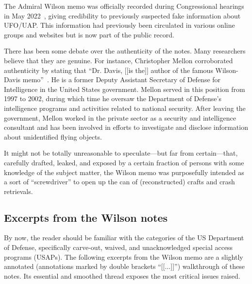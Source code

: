 The Admiral Wilson memo was officially recorded during Congressional hearings in May 2022~\cite{WilsonNotes-Davis}, giving credibility to previously suspected fake information about UFO/UAP. This information had previously been circulated in various online groups and websites but is now part of the public record.

There has been some debate over the authenticity of the notes. Many researchers believe that they are genuine. For instance, Christopher Mellon corroborated authenticity by stating that ``Dr. Davis, [[is the]] author of the famous Wilson-Davis memo''~\cite{Mellon2022Dec}. He is a former Deputy Assistant Secretary of Defense for Intelligence in the United States government. Mellon served in this position from 1997 to 2002, during which time he oversaw the Department of Defense's intelligence programs and activities related to national security. After leaving the government, Mellon worked in the private sector as a security and intelligence consultant and has been involved in efforts to investigate and disclose information about unidentified flying objects.

It might not be totally unreasonable to speculate---but far from certain---that, carefully drafted, leaked, and exposed by a certain fraction of persons with some knowledge of the subject matter, the Wilson memo was purposefully intended as a sort of ``screwdriver'' to open up the can of (reconstructed) crafts and crash retrievals.

\subsection{Excerpts from the Wilson notes}

By now, the reader should be familiar with the categories of the US Department of Defense, specifically carve-out, waived, and unacknowledged special access programs (USAPs). The following excerpts from the Wilson memo are a slightly annotated (annotations marked by double brackets ``[[$\ldots$]]'') walkthrough of these notes. Its essential and smoothed thread exposes the most critical issues raised.

